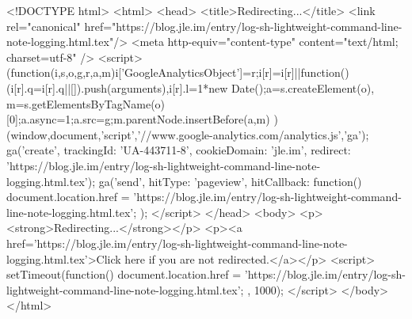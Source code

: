 <!DOCTYPE html>
<html>
<head>
<title>Redirecting...</title>
<link rel="canonical" href="https://blog.jle.im/entry/log-sh-lightweight-command-line-note-logging.html.tex"/>
<meta http-equiv="content-type" content="text/html; charset=utf-8" />
<script>
(function(i,s,o,g,r,a,m){i['GoogleAnalyticsObject']=r;i[r]=i[r]||function(){
(i[r].q=i[r].q||[]).push(arguments)},i[r].l=1*new Date();a=s.createElement(o),
m=s.getElementsByTagName(o)[0];a.async=1;a.src=g;m.parentNode.insertBefore(a,m)
})(window,document,'script','//www.google-analytics.com/analytics.js','ga');
ga('create', { trackingId: 'UA-443711-8', cookieDomain: 'jle.im', redirect: 'https://blog.jle.im/entry/log-sh-lightweight-command-line-note-logging.html.tex'});
ga('send', { hitType: 'pageview', hitCallback: function() { document.location.href = 'https://blog.jle.im/entry/log-sh-lightweight-command-line-note-logging.html.tex'; } });
</script>
</head>
<body>
  <p><strong>Redirecting...</strong></p>
  <p><a href='https://blog.jle.im/entry/log-sh-lightweight-command-line-note-logging.html.tex'>Click here if you are not redirected.</a></p>
  <script>
    setTimeout(function() { document.location.href = 'https://blog.jle.im/entry/log-sh-lightweight-command-line-note-logging.html.tex'; }, 1000);
  </script>
</body>
</html>
